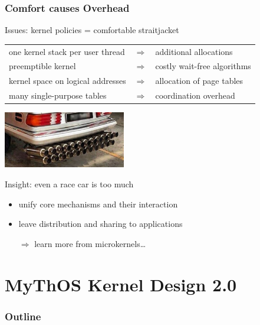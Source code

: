 \documentclass[9pt]{beamer}
\begin{document}
\begin{frame}
  \frametitle{Comfort causes Overhead}

  \begin{block}{Issues: kernel policies = comfortable straitjacket}
  \vspace{0.5em}
  \begin{tabular}{lcl}
  one kernel stack per user thread & $\Rightarrow$ & additional allocations\\
  preemptible kernel & $\Rightarrow$ & costly wait-free algorithms\\
  kernel space on logical addresses & $\Rightarrow$ & allocation of page tables\\
  many single-purpose tables & $\Rightarrow$ & coordination overhead\\
  \end{tabular}
  \end{block}

  \vfill
  \begin{center}
  \includegraphics[width=0.4\textwidth]{figures/3-3-a.jpg}
  \end{center}
  \vfill

  \begin{block}{Insight: even a race car is too much}%
    \begin{itemize}
    \item unify core mechanisms and their interaction
    \item leave distribution and sharing to applications
    \item[$\Rightarrow$] learn more from microkernels\ldots
    \end{itemize}
  \end{block}
\end{frame}

\section{MyThOS Kernel Design 2.0}

\begin{frame}
  \frametitle{Outline}
  \tableofcontents[currentsection]
\end{frame}
\end{document}
